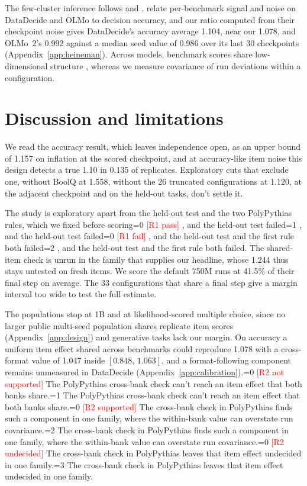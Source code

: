 \documentclass{article}
\newcommand{\ci}[2]{\ensuremath{[#1,\,#2]}}
\newcommand{\pending}[1]{\textcolor{red}{[#1]}}
\newcommand{\Ronecase}{0}
\newcommand{\Rtwocase}{0}
\newcommand{\outcome}[4]{\ifnum#1=0 \pending{#3} #4\else\ifnum#1=#2 #4\fi\fi}
\begin{document}
The few-cluster inference follows \citet{cameron2008} and \citet{mackinnon2017}. \citet{heineman2025} relate per-benchmark signal and noise on DataDecide and OLMo to decision accuracy, and our ratio computed from their checkpoint noise gives DataDecide's accuracy average 1.104, near our 1.078, and OLMo~2's 0.992 against a median seed value of 0.986 over its last 30 checkpoints (Appendix~\ref{app:heineman}). Across models, benchmark scores share low-dimensional structure \citep{ruan2024,burnell2023revealing}, whereas we measure covariance of run deviations within a configuration.

\section{Discussion and limitations}
We read the accuracy result, which leaves independence open, as an upper bound of 1.157 on inflation at the scored checkpoint, and at accuracy-like item noise this design detects a true 1.10 in 0.135 of replicates. Exploratory cuts that exclude one, without BoolQ at 1.558, without the 26 truncated configurations at 1.120, at the adjacent checkpoint and on the held-out tasks, don't settle it.

The study is exploratory apart from the held-out test and the two PolyPythias rules, which we fixed before scoring\outcome{\Ronecase}{1}{R1 pass}{, and the held-out test failed}\outcome{\Ronecase}{2}{R1 fail}{, and the held-out test and the first rule both failed}. The shared-item check is unrun in the family that supplies our headline, whose 1.244 thus stays untested on fresh items. We score the default 750M runs at 41.5\% of their final step on average. The 33 configurations that share a final step give a margin interval too wide to test the full estimate.

The populations stop at 1B and at likelihood-scored multiple choice, since no larger public multi-seed population shares replicate item scores (Appendix~\ref{app:design}) and generative tasks lack our margin. On accuracy a uniform item effect shared across benchmarks could reproduce 1.078 with a cross-format value of 1.047 inside \ci{0.848}{1.063}, and a format-following component remains unmeasured in DataDecide (Appendix~\ref{app:calibration}).\outcome{\Rtwocase}{1}{R2 not supported}{ The PolyPythias cross-bank check can't reach an item effect that both banks share.}\outcome{\Rtwocase}{2}{R2 supported}{ The cross-bank check in PolyPythias finds such a component in one family, where the within-bank value can overstate run covariance.}\outcome{\Rtwocase}{3}{R2 undecided}{ The cross-bank check in PolyPythias leaves that item effect undecided in one family.}
\end{document}
